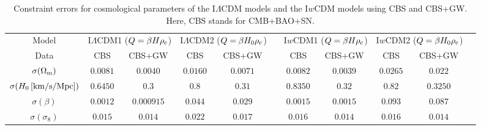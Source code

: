 \documentclass[aps,prd,nofootinbib,amsmath,amssymb,superscriptaddress,twocolumn,10pt]{revtex4}%
\begin{document}
\begin{table}\small
\setlength\tabcolsep{2pt}
\renewcommand{\arraystretch}{1.5}
\centering
\caption{\label{tab3}Constraint errors for cosmological parameters of the I$\Lambda$CDM models and the I$w$CDM models using CBS and CBS+GW. Here, CBS stands for CMB+BAO+SN.}
\begin{tabular}{ccccccccccc}


\hline Model &\multicolumn{2}{c}{I$\Lambda$CDM1 ($Q=\beta H\rho_{\rm c}$)}&\multicolumn{2}{c}{I$\Lambda$CDM2 ($Q=\beta H_{0}\rho_{\rm c}$)}&&\multicolumn{2}{c}{I$w$CDM1 ($Q=\beta H\rho_{\rm c}$)}&\multicolumn{2}{c}{I$w$CDM2 ($Q=\beta H_{0}\rho_{\rm c}$)}\\
           \cline{2-5}\cline{7-10}
       Data  & CBS&CBS+GW &CBS&CBS+GW &&CBS&CBS+GW&CBS&CBS+GW\\

\hline
$\sigma(\Omega_{\rm m})$                         &$0.0081$
                                         &$0.0040$
                                         &$0.0160$
                                         &$0.0071$
                                         &&$0.0082$
                                         &$0.0039$
                                         &$0.0265$
                                         &$0.022$\\

$\sigma(H_0\,[{\rm km}/{\rm s}/{\rm Mpc}])$      &$0.6450$
                                         &$0.3$
                                         &$0.8$
                                         &$0.31$
                                         &&$0.8350$
                                         &$0.32$
                                         &$0.82$
                                         &$0.3250$\\

$\sigma(\beta)$                                  &$0.0012$
                                         &$0.000915$
                                         &$0.044$
                                         &$0.029$
                                         &&$0.0015$
                                         &$0.0015$
                                         &$0.093$
                                         &$0.087$\\

$\sigma(\sigma_{8})$                             &$0.015$
                                         &$0.014$
                                         &$0.022$
                                         &$0.017$
                                         &&$0.016$
                                         &$0.014$
                                         &$0.016$
                                         &$0.014$\\


\end{tabular}
\end{table}
\end{document}
